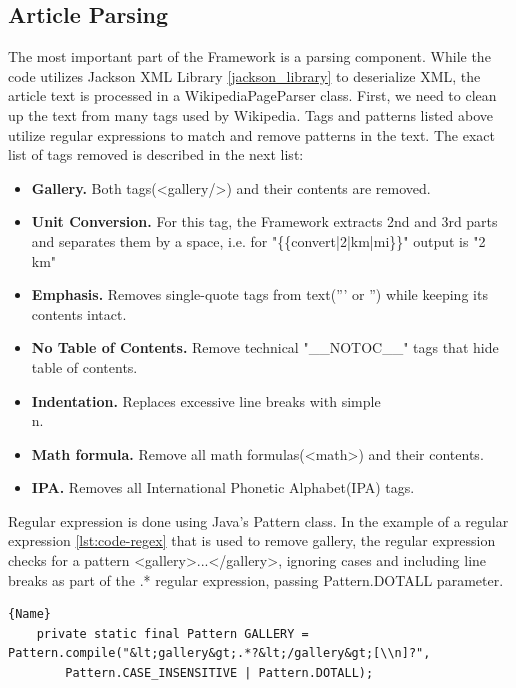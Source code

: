 \documentclass[thesis=M,english,hidelinks]{FITthesis}[2019/12/23]
\begin{document}
\subsection{Article Parsing}\label{article_parsing}

The most important part of the Framework is a parsing component. While the code utilizes Jackson XML Library \ref{jackson_library} to deserialize XML, the article text is processed in a WikipediaPageParser class. First, we need to clean up the text from many tags used by Wikipedia\cite{Wikipedia_Template}.  Tags and patterns listed above utilize regular expressions to match and remove patterns in the text. The exact list of tags removed is described in the next list:

\begin{itemize}
	\item \textbf{Gallery.} Both tags(<gallery/>) and their contents are removed. 
	\item \textbf{Unit Conversion.}  For this tag, the Framework extracts 2nd and 3rd parts and separates them by a space, i.e. for "\{\{convert|2|km|mi\}\}" output is "2 km"
	\item \textbf{Emphasis.} Removes single-quote tags from text(''' or '') while keeping its contents intact.
	\item \textbf{No Table of Contents.} Remove technical "\_\_NOTOC\_\_" tags that hide table of contents.
	\item \textbf{Indentation.} Replaces excessive line breaks with simple \\n.
	\item \textbf{Math formula.} Remove all math formulas(<math>) and their contents.
	\item \textbf{IPA.} Removes all International Phonetic Alphabet(IPA) tags.
\end{itemize}

Regular expression is done using Java's Pattern class. In the example of a regular expression \ref{lst:code-regex} that is used  to remove gallery, the regular expression checks for a pattern <gallery>...</gallery>, ignoring cases and including line breaks as part of the .* regular expression, passing Pattern.DOTALL parameter.

\begin{lstlisting}[caption=Example of a regular expression,frame=tlrb,  label = {lst:code-regex}]{Name}
	private static final Pattern GALLERY = Pattern.compile("&lt;gallery&gt;.*?&lt;/gallery&gt;[\\n]?",
		Pattern.CASE_INSENSITIVE | Pattern.DOTALL);
\end{lstlisting}
\end{document}
